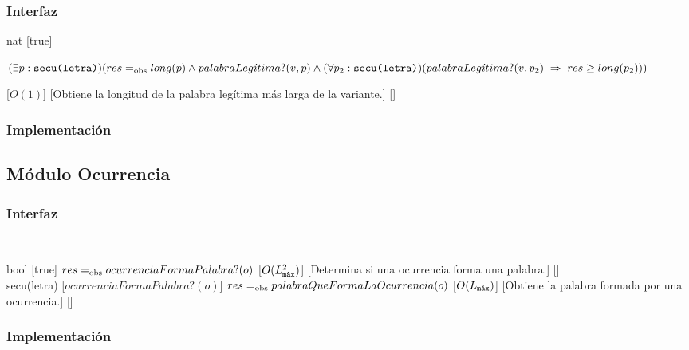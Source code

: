 \begin{interfaz}{\subsubsection{Interfaz}}
\begin{operaciones}
    \noindent{}
    {}{nat}
    [true]
    {
      \begin{adjustwidth}{2em}{}

      $(\exists p:\texttt{secu(letra)})(res\igobs long(p)\land palabraLeg\acute{\imath}tima?(v,p)\land\\(\forall p_{2}:\texttt{secu(letra)})( palabraLeg\acute{\imath}tima?(v,p_{2})\implies res\geq long(p_{2})))$
      \end{adjustwidth}
    }
    [$O(1)$]
    [Obtiene la longitud de la palabra legítima más larga de la variante.]
    [\falta]
  \end{operaciones}
\end{interfaz}
\subsubsection{Implementación}

\subsection{Módulo Ocurrencia}
\begin{interfaz}{\subsubsection{Interfaz}}
  \\
  \usa{\falta}
  \par\noindent
  \begin{operaciones}
    {}{bool}
    [true]
    {$res\igobs ocurrenciaFormaPalabra?(o)$}
    [$O(\Lmax^{2})$]
    [Determina si una ocurrencia forma una palabra.]
    [\falta]\\

    \noindent{}
    {}{secu(letra)}
    [$ocurrenciaFormaPalabra?(o)$]
    {$res\igobs palabraQueFormaLaOcurrencia(o)$}
    [$O(\Lmax)$]
    [Obtiene la palabra formada por una ocurrencia.]
    [\falta]
  \end{operaciones}
\end{interfaz}
\subsubsection{Implementación}

